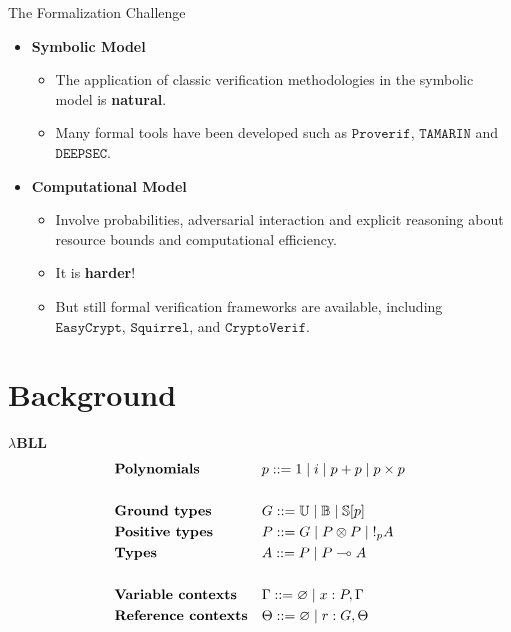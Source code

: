 \documentclass{beamer}[aspectratio=169]
\newcommand{\lamBLL}{{\lambda}\mathbf{BLL}}
\begin{document}
\begin{frame}{The Formalization Challenge}
    \begin{itemize}
        \setlength\itemsep{.7em}
        \item \textbf{Symbolic Model}
        \begin{itemize}
            \setlength\itemsep{.7em}
            \item The application of classic verification methodologies in the symbolic model is \textbf{natural}.
            \item Many formal tools have been developed such as $\mathtt{Proverif}$, $\mathtt{TAMARIN}$ and $\mathtt{DEEPSEC}$.
        \end{itemize}
        
        \item \textbf{Computational Model}
        \begin{itemize}
            \setlength\itemsep{.7em}
            \item Involve probabilities, adversarial interaction and explicit reasoning about resource bounds and computational efficiency.
            \item<2-> It is \textbf{harder}!
            \item<3-> But still formal verification frameworks are available, including $\mathtt{EasyCrypt}$, $\mathtt{Squirrel}$, and $\mathtt{CryptoVerif}$.
        \end{itemize}
    \end{itemize}
\end{frame}

\section{Background}

\begin{frame}{$\lamBLL$}
    \small
    \begin{align*}
        & \textbf{Polynomials} \; && p ::= 1 \mid i \mid p + p \mid p\times p \\ \\
        &\textbf{Ground types}  && G ::= \mathbb{U} \mid \mathbb{B} \mid \mathbb{S}[p] \\
        &\textbf{Positive types} \; && P ::= G \mid P \otimes P \mid \mathord{!}_p A \\
        &\textbf{Types} \; && A ::= P \mid P \multimap A \\ \\
        &\textbf{Variable contexts} && \Gamma ::= \varnothing \mid x :P, \Gamma \\
        &\textbf{Reference contexts} && \Theta ::= \varnothing \mid r : G , \Theta
    \end{align*}
\end{frame}
\end{document}
